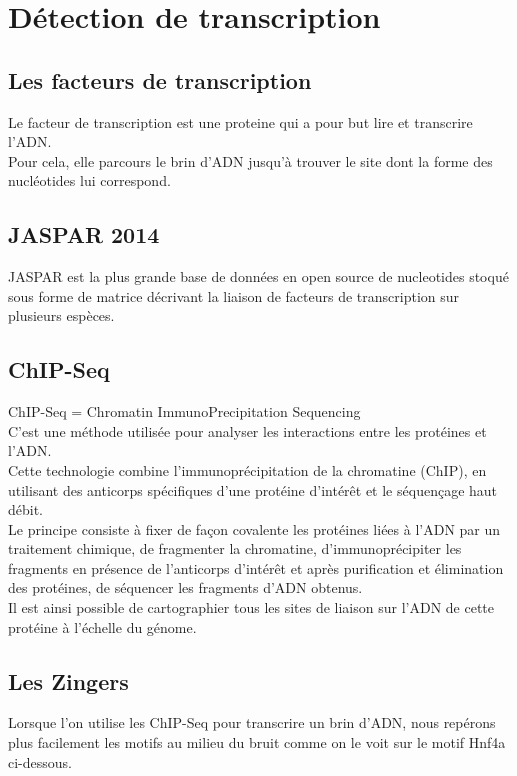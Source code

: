 \section{Détection de transcription}

\subsection{Les facteurs de transcription}
Le facteur de transcription est une proteine qui a pour but lire et transcrire l'ADN.\\
Pour cela, elle parcours le brin d'ADN jusqu'à trouver le site dont la forme des nucléotides lui correspond.

\subsection{JASPAR 2014}

JASPAR est la plus grande base de données en open source de nucleotides stoqué sous forme de matrice décrivant la liaison de facteurs de transcription sur plusieurs espèces.

\subsection{ChIP-Seq}

ChIP-Seq = Chromatin ImmunoPrecipitation Sequencing\\
C'est une méthode utilisée pour analyser les interactions entre les protéines et l’ADN.\\
Cette technologie combine l’immunoprécipitation de la chromatine (ChIP), en utilisant des anticorps spécifiques d’une protéine d’intérêt et le séquençage haut débit.\\
Le principe consiste à fixer de façon covalente les protéines liées à l’ADN par un traitement chimique, de fragmenter la chromatine, d’immunoprécipiter les fragments en présence de l’anticorps d’intérêt et après purification et élimination des protéines, de séquencer les fragments d’ADN obtenus.\\
Il est ainsi possible de cartographier tous les sites de liaison sur l’ADN de cette protéine à l’échelle du génome.

\subsection{Les Zingers}

Lorsque l'on utilise les ChIP-Seq pour transcrire un brin d'ADN, nous repérons plus facilement les motifs au milieu du bruit comme on le voit sur le motif Hnf4a ci-dessous.\\

